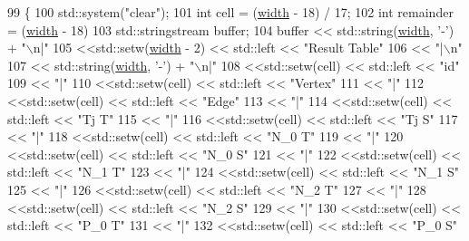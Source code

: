 \begin{DoxyCode}
99 \{
100     std::system(\textcolor{stringliteral}{"clear"});
101     \textcolor{keywordtype}{int} cell = (\hyperlink{class_visualize_af5ac723ad5f8fe8c4a8378bf1299cda7}{width} - 18) / 17;
102     \textcolor{keywordtype}{int} remainder = (\hyperlink{class_visualize_af5ac723ad5f8fe8c4a8378bf1299cda7}{width} - 18) %
103     std::stringstream buffer;
104     buffer << std::string(\hyperlink{class_visualize_af5ac723ad5f8fe8c4a8378bf1299cda7}{width}, \textcolor{charliteral}{'-'}) + \textcolor{stringliteral}{"\(\backslash\)n|"}
105            <<std::setw(\hyperlink{class_visualize_af5ac723ad5f8fe8c4a8378bf1299cda7}{width} - 2) << std::left << \textcolor{stringliteral}{"Result Table"}
106            << \textcolor{stringliteral}{"|\(\backslash\)n"}
107            << std::string(\hyperlink{class_visualize_af5ac723ad5f8fe8c4a8378bf1299cda7}{width}, \textcolor{charliteral}{'-'}) + \textcolor{stringliteral}{"\(\backslash\)n|"}
108            <<std::setw(cell) << std::left << \textcolor{stringliteral}{"id"}
109            << \textcolor{stringliteral}{"|"}
110            <<std::setw(cell) << std::left << \textcolor{stringliteral}{"Vertex"}
111            << \textcolor{stringliteral}{"|"}
112            <<std::setw(cell) << std::left << \textcolor{stringliteral}{"Edge"}
113            << \textcolor{stringliteral}{"|"}
114            <<std::setw(cell) << std::left << \textcolor{stringliteral}{"Tj T"}
115            << \textcolor{stringliteral}{"|"}
116            <<std::setw(cell) << std::left << \textcolor{stringliteral}{"Tj S"}
117            << \textcolor{stringliteral}{"|"}
118            <<std::setw(cell) << std::left << \textcolor{stringliteral}{"N\_0 T"}
119            << \textcolor{stringliteral}{"|"}
120            <<std::setw(cell) << std::left << \textcolor{stringliteral}{"N\_0 S"}
121            << \textcolor{stringliteral}{"|"}
122            <<std::setw(cell) << std::left << \textcolor{stringliteral}{"N\_1 T"}
123            << \textcolor{stringliteral}{"|"}
124            <<std::setw(cell) << std::left << \textcolor{stringliteral}{"N\_1 S"}
125            << \textcolor{stringliteral}{"|"}
126            <<std::setw(cell) << std::left << \textcolor{stringliteral}{"N\_2 T"}
127            << \textcolor{stringliteral}{"|"}
128            <<std::setw(cell) << std::left << \textcolor{stringliteral}{"N\_2 S"}
129            << \textcolor{stringliteral}{"|"}
130            <<std::setw(cell) << std::left << \textcolor{stringliteral}{"P\_0 T"}
131            << \textcolor{stringliteral}{"|"}
132            <<std::setw(cell) << std::left << \textcolor{stringliteral}{"P\_0 S"}

\end{DoxyCode}
